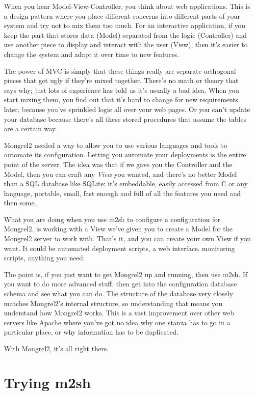 When you hear Model-View-Controller, you think about web applications.  This is a design pattern
where you place different concerns into different parts of your system and try not to mix them
too much.  For an interactive application, if you keep the part that stores data (Model) separated
from the logic (Controller) and use another piece to display and interact with the user (View), then
it's easier to change the system and adapt it over time to new features.

The power of MVC is simply that these things really are separate orthogonal pieces that get
ugly if they're mixed together.  There's no math or theory that says why; just lots of
experience has told us it's usually a bad idea.  When you start mixing them, you find out that
it's hard to change for new requirements later, because you've sprinkled logic all over your
web pages.  Or you can't update your database because there's all these stored procedures that
assume the tables are a certain way.

Mongrel2 needed a way to allow you to use various languages and tools to automate its configuration.
Letting you automate your deployments is the entire point of the server.  The idea was that if we
gave you the Controller and the Model, then you can craft any \emph{View} you wanted, and there's
no better Model than a SQL database like SQLite:  it's embeddable, easily accessed from C or any
language, portable, small, fast enough and full of all the features you need and then some.

What you are doing when you use m2sh to configure a configuration for Mongrel2, is working with
a View we've given you to create a Model for the Mongrel2 server to work with.  That's it, and
you can create your own View if you want.  It could be automated deployment scripts, a web
interface, monitoring scripts, anything you need.

The point is, if you just want to get Mongrel2 up and running, then use m2sh.  If you want to
do more advanced stuff, then get into the configuration database schema and see what you can
do.  The structure of the database very closely matches Mongrel2's internal structure, so
understanding that means you understand how Mongrel2 works.  This is a vast improvement over
other web servers like Apache where you've got no idea why one stanza has to go in a particular
place, or why information has to be duplicated.

With Mongrel2, it's all right there.


\section{Trying m2sh}

